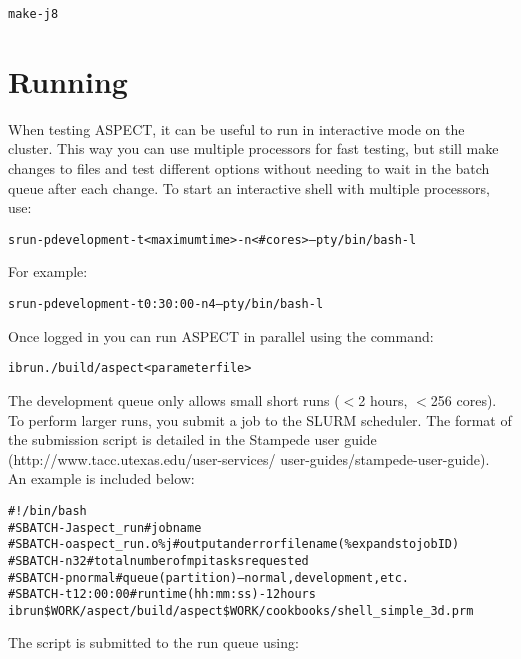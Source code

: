 \documentclass[12pt]{article}
\begin{document}
 \begin{alltt}\footnotesize
make -j8 
 \end{alltt}

\section{Running}
When testing ASPECT, it can be useful to run in interactive mode on the cluster. This way you can use multiple processors for fast testing, but still make changes to files and test different options without needing to wait in the batch queue after each change. To start an interactive shell with multiple processors, use: 

 \begin{alltt}\footnotesize
srun -p development -t <maximum time> -n <\#cores> --pty /bin/bash -l 
 \end{alltt}
 
\noindent For example: 
 \begin{alltt}\footnotesize
srun -p development -t 0:30:00 -n 4 --pty /bin/bash -l 
 \end{alltt}
 
\noindent Once logged in you can run ASPECT in parallel using the command:
 
  \begin{alltt}\footnotesize
ibrun ./build/aspect <parameter file> 
  \end{alltt}
 
\noindent The development queue only allows small short runs ($<$2 hours, $<$256 cores). To perform larger runs, you submit a job to the SLURM scheduler. The format of the submission script is detailed in the Stampede user guide (http://www.tacc.utexas.edu/user-services/ user-guides/stampede-user-guide). An example is included below: \\
 
   \begin{alltt}\footnotesize
\#!/bin/bash 
\#SBATCH -J aspect\_run   \# job name 
\#SBATCH -o aspect\_run.o\%j   \# output and error file name (\% expands to jobID) 
\#SBATCH -n 32  \# total number of mpi tasks requested 
\#SBATCH -p normal \# queue (partition) -- normal, development, etc. 
\#SBATCH -t 12:00:00 \# run time (hh:mm:ss) - 12 hours 
ibrun \$WORK/aspect/build/aspect \$WORK/cookbooks/shell\_simple\_3d.prm 
  \end{alltt}

The script is submitted to the run queue using: \\
 
\end{document}
